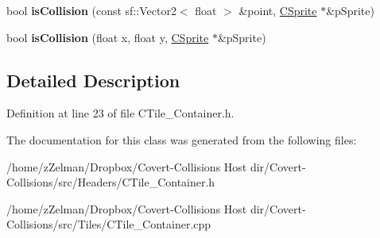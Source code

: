 \begin{DoxyCompactItemize}
\item 
\hypertarget{classCTile__Container_a4195d75fcc4790946b19ea82fc693a1c}{bool {\bfseries is\-Collision} (const sf\-::\-Vector2$<$ float $>$ \&point, \hyperlink{classCSprite}{C\-Sprite} $\ast$\&p\-Sprite)}\label{classCTile__Container_a4195d75fcc4790946b19ea82fc693a1c}

\item 
\hypertarget{classCTile__Container_a3c8b4ccbb9afaaa9462a11962b6e2dbd}{bool {\bfseries is\-Collision} (float x, float y, \hyperlink{classCSprite}{C\-Sprite} $\ast$\&p\-Sprite)}\label{classCTile__Container_a3c8b4ccbb9afaaa9462a11962b6e2dbd}

\end{DoxyCompactItemize}


\subsection{Detailed Description}


Definition at line 23 of file C\-Tile\-\_\-\-Container.\-h.



The documentation for this class was generated from the following files\-:\begin{DoxyCompactItemize}
\item 
/home/z\-Zelman/\-Dropbox/\-Covert-\/\-Collisions Host dir/\-Covert-\/\-Collisions/src/\-Headers/C\-Tile\-\_\-\-Container.\-h\item 
/home/z\-Zelman/\-Dropbox/\-Covert-\/\-Collisions Host dir/\-Covert-\/\-Collisions/src/\-Tiles/C\-Tile\-\_\-\-Container.\-cpp\end{DoxyCompactItemize}
